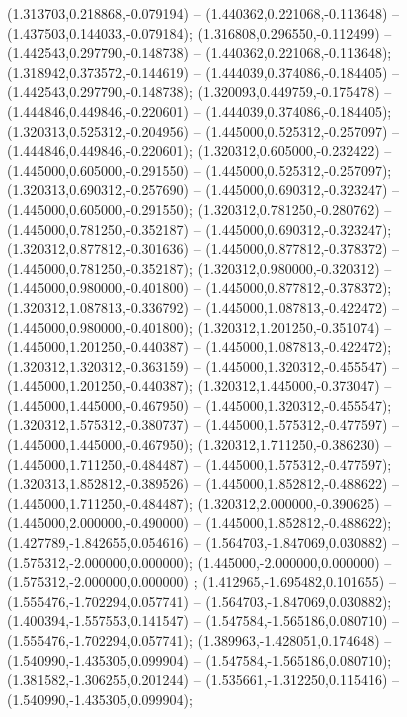  (1.313703,0.218868,-0.079194) -- (1.440362,0.221068,-0.113648) -- (1.437503,0.144033,-0.079184);
 (1.316808,0.296550,-0.112499) -- (1.442543,0.297790,-0.148738) -- (1.440362,0.221068,-0.113648);
 (1.318942,0.373572,-0.144619) -- (1.444039,0.374086,-0.184405) -- (1.442543,0.297790,-0.148738);
 (1.320093,0.449759,-0.175478) -- (1.444846,0.449846,-0.220601) -- (1.444039,0.374086,-0.184405);
 (1.320313,0.525312,-0.204956) -- (1.445000,0.525312,-0.257097) -- (1.444846,0.449846,-0.220601);
 (1.320312,0.605000,-0.232422) -- (1.445000,0.605000,-0.291550) -- (1.445000,0.525312,-0.257097);
 (1.320313,0.690312,-0.257690) -- (1.445000,0.690312,-0.323247) -- (1.445000,0.605000,-0.291550);
 (1.320312,0.781250,-0.280762) -- (1.445000,0.781250,-0.352187) -- (1.445000,0.690312,-0.323247);
 (1.320312,0.877812,-0.301636) -- (1.445000,0.877812,-0.378372) -- (1.445000,0.781250,-0.352187);
 (1.320312,0.980000,-0.320312) -- (1.445000,0.980000,-0.401800) -- (1.445000,0.877812,-0.378372);
 (1.320312,1.087813,-0.336792) -- (1.445000,1.087813,-0.422472) -- (1.445000,0.980000,-0.401800);
 (1.320312,1.201250,-0.351074) -- (1.445000,1.201250,-0.440387) -- (1.445000,1.087813,-0.422472);
 (1.320312,1.320312,-0.363159) -- (1.445000,1.320312,-0.455547) -- (1.445000,1.201250,-0.440387);
 (1.320312,1.445000,-0.373047) -- (1.445000,1.445000,-0.467950) -- (1.445000,1.320312,-0.455547);
 (1.320312,1.575312,-0.380737) -- (1.445000,1.575312,-0.477597) -- (1.445000,1.445000,-0.467950);
 (1.320312,1.711250,-0.386230) -- (1.445000,1.711250,-0.484487) -- (1.445000,1.575312,-0.477597);
 (1.320313,1.852812,-0.389526) -- (1.445000,1.852812,-0.488622) -- (1.445000,1.711250,-0.484487);
 (1.320312,2.000000,-0.390625) -- (1.445000,2.000000,-0.490000) -- (1.445000,1.852812,-0.488622);
 (1.427789,-1.842655,0.054616) -- (1.564703,-1.847069,0.030882) -- (1.575312,-2.000000,0.000000);
 (1.445000,-2.000000,0.000000) -- (1.575312,-2.000000,0.000000) ;
 (1.412965,-1.695482,0.101655) -- (1.555476,-1.702294,0.057741) -- (1.564703,-1.847069,0.030882);
 (1.400394,-1.557553,0.141547) -- (1.547584,-1.565186,0.080710) -- (1.555476,-1.702294,0.057741);
 (1.389963,-1.428051,0.174648) -- (1.540990,-1.435305,0.099904) -- (1.547584,-1.565186,0.080710);
 (1.381582,-1.306255,0.201244) -- (1.535661,-1.312250,0.115416) -- (1.540990,-1.435305,0.099904);
